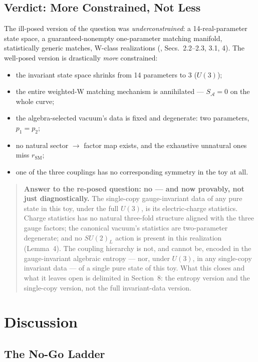 \documentclass[11pt]{article}
\newcommand{\SA}{S_{\mathcal{A}}}
\newcommand{\rSM}{r_{\mathrm{SM}}}
\begin{document}
\subsection{Verdict: More Constrained, Not Less}

The ill-posed version of the question was \emph{underconstrained}: a 14-real-parameter state space, a guaranteed-nonempty one-parameter matching manifold, statistically generic matches, W-class realizations (\cite{companion}, Secs.~2.2--2.3, 3.1, 4). The well-posed version is drastically \emph{more} constrained:

\begin{itemize}
\item the invariant state space shrinks from 14 parameters to 3 ($U(3)$);
\item the entire weighted-W matching mechanism is annihilated --- $\SA = 0$ on the whole curve;
\item the algebra-selected vacuum's data is fixed and degenerate: two parameters, $p_1 = p_2$;
\item no natural sector $\to$ factor map exists, and the exhaustive unnatural ones miss $\rSM$;
\item one of the three couplings has no corresponding symmetry in the toy at all.
\end{itemize}

\begin{quote}
\textbf{Answer to the re-posed question: no --- and now provably, not just diagnostically.} The single-copy gauge-invariant data of any pure state in this toy, under the full $U(3)$, is its electric-charge statistics. Charge statistics has no natural three-fold structure aligned with the three gauge factors; the canonical vacuum's statistics are two-parameter degenerate; and no $SU(2)_L$ action is present in this realization (Lemma~4). The coupling hierarchy is not, and cannot be, encoded in the gauge-invariant algebraic entropy --- nor, under $U(3)$, in any single-copy invariant data --- of a single pure state of this toy. What this closes and what it leaves open is delimited in Section~8: the entropy version and the single-copy version, not the full invariant-data version.
\end{quote}

\section{Discussion}

\subsection{The No-Go Ladder}
\end{document}
